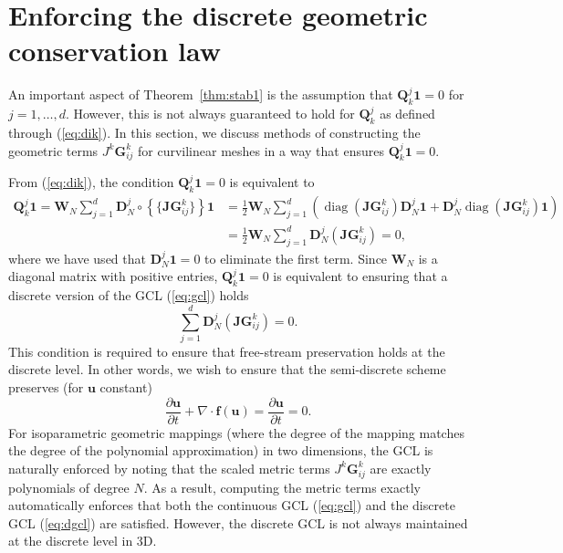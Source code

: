 \documentclass[preprint,10pt]{article}
\theoremstyle{definition}
\theoremstyle{lemma}
\theoremstyle{theorem}
\theoremstyle{assumption}
\DeclareMathOperator{\diag}{diag}
\newcommand{\pd}[2]{\frac{\partial#1}{\partial#2}}
\newcommand{\LRp}[1]{\left( #1 \right)}
\newcommand{\LRc}[1]{\left\{ #1 \right\}}
\newcommand{\avg}[1] {\ensuremath{\LRc{\!\{#1\}\!}}}
\newcommand{\Grad} {\ensuremath{\nabla}}
\begin{document}
{\section{Enforcing the discrete geometric conservation law}

An important aspect of Theorem~\ref{thm:stab1} is the assumption that $\bm{Q}^j_k\bm{1} = 0$ for $j = 1,\ldots,d$.  However, this is not always guaranteed to hold for $\bm{Q}^j_k$ as defined through (\ref{eq:dik}).  In this section, we discuss methods of constructing the geometric terms $J^k\bm{G}^k_{ij}$ for curvilinear meshes in a way that ensures $\bm{Q}^j_k\bm{1} = 0$.  

From (\ref{eq:dik}), the condition $\bm{Q}^j_k\bm{1} = 0$ is equivalent to
\begin{align*}
\bm{Q}^j_k\bm{1} = \bm{W}_N\sum_{j=1}^d\bm{D}^j_N\circ \avg{\bm{JG}_{ij}^k}\bm{1} &= \frac{1}{2}\bm{W}_N\sum_{j=1}^d \LRp{ \diag\LRp{\bm{JG}_{ij}^k}\bm{D}^j_N \bm{1} + \bm{D}^j_N\diag\LRp{\bm{JG}_{ij}^k}\bm{1}} \\
&= \frac{1}{2}\bm{W}_N\sum_{j=1}^d \bm{D}^j_N\LRp{\bm{JG}_{ij}^k} = 0,
\end{align*}
where we have used that $\bm{D}^j_N \bm{1} = 0$ to eliminate the first term.  Since $\bm{W}_N$ is a diagonal matrix with positive entries, $\bm{Q}^j_k\bm{1} = 0$ is equivalent to ensuring that a discrete version of the GCL (\ref{eq:gcl}) holds
\begin{equation}
\sum_{j=1}^d \bm{D}^j_N\LRp{\bm{JG}_{ij}^k} = 0.
\label{eq:dgcl}
\end{equation}
This condition is required to ensure that free-stream preservation holds at the discrete level.  In other words, we wish to ensure that the semi-discrete scheme preserves (for $\bm{u}$ constant) 
\[
\pd{\bm{u}}{t} + \Grad \cdot \bm{f}(\bm{u}) = \pd{\bm{u}}{t} = 0.
\]
For isoparametric geometric mappings (where the degree of the mapping matches the degree of the polynomial approximation) in two dimensions, the GCL is naturally enforced by noting that the scaled metric terms $J^k\bm{G}^k_{ij}$ are exactly polynomials of degree $N$.  As a result, computing the metric terms exactly automatically enforces that both the continuous GCL (\ref{eq:gcl}) and the discrete GCL (\ref{eq:dgcl}) are satisfied.  However, the discrete GCL is not always maintained at the discrete level in 3D.  

}
\end{document}
